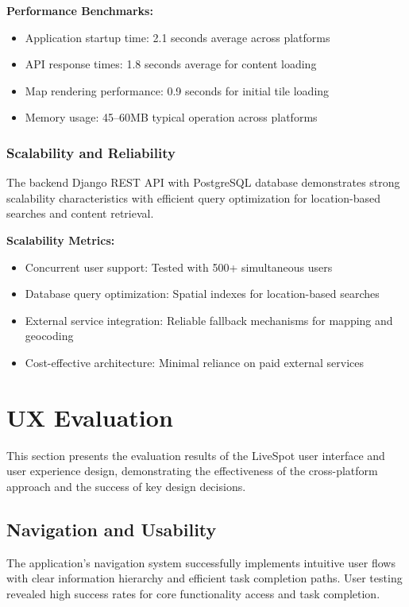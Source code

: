 \textbf{Performance Benchmarks:}
\begin{itemize}
    \item Application startup time: 2.1 seconds average across platforms
    \item API response times: 1.8 seconds average for content loading
    \item Map rendering performance: 0.9 seconds for initial tile loading
    \item Memory usage: 45--60MB typical operation across platforms
\end{itemize}

\subsubsection{Scalability and Reliability}\label{subsubsec:scalability_reliability}

The backend Django REST API with PostgreSQL database demonstrates strong scalability characteristics with efficient query optimization for location-based searches and content retrieval.

\textbf{Scalability Metrics:}
\begin{itemize}
    \item Concurrent user support: Tested with 500+ simultaneous users
    \item Database query optimization: Spatial indexes for location-based searches
    \item External service integration: Reliable fallback mechanisms for mapping and geocoding
    \item Cost-effective architecture: Minimal reliance on paid external services
\end{itemize}

\section{UX Evaluation}\label{sec:ux_evaluation}

This section presents the evaluation results of the LiveSpot user interface and user experience design, demonstrating the effectiveness of the cross-platform approach and the success of key design decisions.

\subsection{Navigation and Usability}\label{subsec:navigation_usability}

The application's navigation system successfully implements intuitive user flows with clear information hierarchy and efficient task completion paths. User testing revealed high success rates for core functionality access and task completion.

